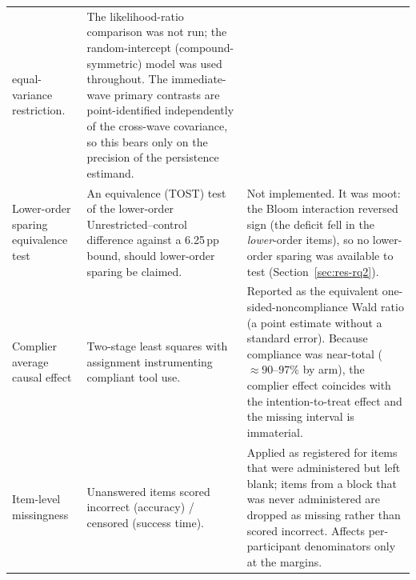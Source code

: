 \begin{table}[htbp]
\begin{tabular}{p{} p{} p{}}
        equal-variance restriction.
      & The likelihood-ratio comparison was not run; the random-intercept
        (compound-symmetric) model was used throughout. The immediate-wave
        primary contrasts are point-identified independently of the cross-wave
        covariance, so this bears only on the precision of the persistence
        estimand. \\
    Lower-order sparing equivalence test
      & An equivalence (TOST) test of the lower-order Unrestricted--control
        difference against a 6.25\,pp bound, should lower-order sparing be
        claimed.
      & Not implemented. It was moot: the Bloom interaction reversed sign
        (the deficit fell in the \emph{lower}-order items), so no lower-order
        sparing was available to test (Section~\ref{sec:res-rq2}). \\
    Complier average causal effect
      & Two-stage least squares with assignment instrumenting compliant tool use.
      & Reported as the equivalent one-sided-noncompliance Wald ratio (a point
        estimate without a standard error). Because compliance was near-total
        ($\approx 90$--$97\%$ by arm), the complier effect coincides with the
        intention-to-treat effect and the missing interval is immaterial. \\
    Item-level missingness
      & Unanswered items scored incorrect (accuracy) / censored (success time).
      & Applied as registered for items that were administered but left blank;
        items from a block that was never administered are dropped as missing
        rather than scored incorrect. Affects per-participant denominators only
        at the margins. \\
    \bottomrule
  \end{tabular}
\end{table}

